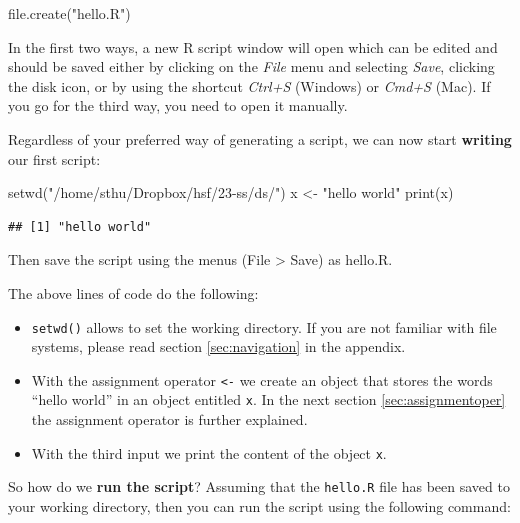 \documentclass[
  12pt,
  oneside]{book}
\newenvironment{Shaded}{\begin{snugshade}}{\end{snugshade}}
\newcommand{\FunctionTok}[1]{\textcolor[rgb]{0.00,0.00,0.00}{#1}}
\newcommand{\NormalTok}[1]{#1}
\newcommand{\OtherTok}[1]{\textcolor[rgb]{0.56,0.35,0.01}{#1}}
\newcommand{\StringTok}[1]{\textcolor[rgb]{0.31,0.60,0.02}{#1}}
\providecommand{\tightlist}{%
  \setlength{\itemsep}{0pt}\setlength{\parskip}{0pt}}
\theoremstyle{definition}
\theoremstyle{definition}
\theoremstyle{definition}
\theoremstyle{definition}
\theoremstyle{remark}
\begin{document}
\begin{Shaded}
\begin{Highlighting}[]
\FunctionTok{file.create}\NormalTok{(}\StringTok{"hello.R"}\NormalTok{)}
\end{Highlighting}
\end{Shaded}

In the first two ways, a new R script window will open which can be edited and should be saved either by clicking on the \emph{File} menu and selecting \emph{Save}, clicking the disk icon, or by using the shortcut \emph{Ctrl+S} (Windows) or \emph{Cmd+S} (Mac).
If you go for the third way, you need to open it manually.

Regardless of your preferred way of generating a script, we can now start \textbf{writing} our first script:

\begin{Shaded}
\begin{Highlighting}[]
\FunctionTok{setwd}\NormalTok{(}\StringTok{"/home/sthu/Dropbox/hsf/23{-}ss/ds/"}\NormalTok{)}
\NormalTok{x }\OtherTok{\textless{}{-}} \StringTok{"hello world"}
\FunctionTok{print}\NormalTok{(x)}
\end{Highlighting}
\end{Shaded}

\begin{verbatim}
## [1] "hello world"
\end{verbatim}

Then save the script using the menus (File \textgreater{} Save) as hello.R.

The above lines of code do the following:

\begin{itemize}
\tightlist
\item
  \texttt{setwd()} allows to set the working directory. If you are not familiar with file systems, please read section \ref{sec:navigation} in the appendix.
\item
  With the assignment operator \texttt{\textless{}-} we create an object that stores the words ``hello world'' in an object entitled \texttt{x}. In the next section \ref{sec:assignmentoper} the assignment operator is further explained.
\item
  With the third input we print the content of the object \texttt{x}.
\end{itemize}

So how do we \textbf{run the script}? Assuming that the \texttt{hello.R} file has been saved to your working directory, then you can run the script using the following command:
\end{document}

